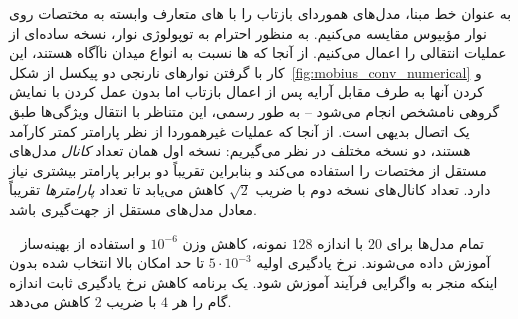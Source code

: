 به عنوان خط مبنا، مدل‌های هموردای بازتاب را با های متعارف وابسته به مختصات روی نوار مؤبیوس مقایسه می‌کنیم.
به منظور احترام به توپولوژی نوار، نسخه ساده‌ای از عملیات  انتقالی را اعمال می‌کنیم.
از آنجا که ها نسبت به انواع میدان ناآگاه هستند، این کار با گرفتن نوارهای نارنجی دو پیکسل از شکل~\ref{fig:mobius_conv_numerical} و  کردن آنها به طرف مقابل آرایه پس از اعمال بازتاب اما بدون عمل کردن با نمایش گروهی نامشخص انجام می‌شود -- به طور رسمی، این متناظر با انتقال ویژگی‌ها طبق یک اتصال بدیهی است.
از آنجا که عملیات غیرهموردا از نظر پارامتر کمتر کارآمد هستند، دو نسخه مختلف در نظر می‌گیریم:
نسخه اول همان تعداد \emph{کانال} مدل‌های مستقل از مختصات را استفاده می‌کند و بنابراین تقریباً دو برابر پارامتر بیشتری نیاز دارد.
تعداد کانال‌های نسخه دوم با ضریب $\sqrt{2}$ کاهش می‌یابد تا تعداد \emph{پارامترها} تقریباً معادل مدل‌های مستقل از جهت‌گیری باشد.

تمام مدل‌ها برای $20$  با اندازه  $128$ نمونه، کاهش وزن $10^{-6}$ و استفاده از بهینه‌ساز ~\cite{Kingma2015-yq} آموزش داده می‌شوند.
نرخ یادگیری اولیه $5\cdot10^{-3}$ تا حد امکان بالا انتخاب شده بدون اینکه منجر به واگرایی فرآیند آموزش شود.
یک برنامه کاهش نرخ یادگیری ثابت اندازه گام را هر $4$  با ضریب $2$ کاهش می‌دهد.

